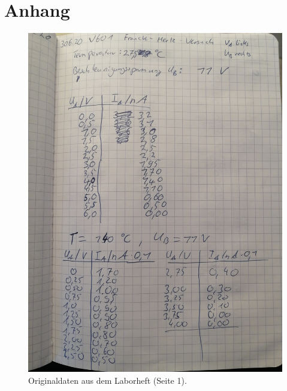\section{Anhang}
\begin{figure}
    \centering
    \includegraphics[width=\textwidth]{content/data/daten1.jpg}
    \caption{Originaldaten aus dem Laborheft (Seite 1).}
\end{figure}
